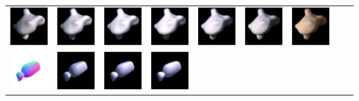 \begin{center}
\begin{longtable}{@{}c@{}c@{}c@{}c@{}c@{}c@{}c@{}c@{}c@{}}
\includegraphics[width=0.1\linewidth]{training/33_1.png} & \includegraphics[width=0.1\linewidth]{training/33_2.png} &
\includegraphics[width=0.1\linewidth]{training/33_3.png} & \includegraphics[width=0.1\linewidth]{training/33_4.png} &
\includegraphics[width=0.1\linewidth]{training/33_5.png} & \includegraphics[width=0.1\linewidth]{training/33_6.png} &
\includegraphics[width=0.1\linewidth]{training/33_7.png} \\
\includegraphics[width=0.1\linewidth]{training/34_gt.png} & \includegraphics[width=0.1\linewidth]{training/34_0.png} &
\includegraphics[width=0.1\linewidth]{training/34_1.png} & \includegraphics[width=0.1\linewidth]{training/34_2.png} &

\end{longtable}
\end{center}
